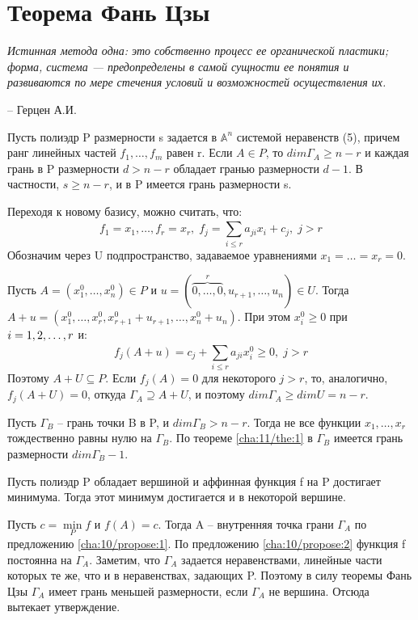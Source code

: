 \chapter{Теорема Фань Цзы}
\label{cha:12}

\epigraph{
	\textit{Истинная метода одна: это собственно процесс ее органической пластики; форма, система — предопределены в самой сущности ее понятия и развиваются по мере стечения условий и возможностей осуществления их.}}
{-- Герцен А.И.}

\begin{theorem}\label{cha:12/the:1}
	Пусть полиэдр P размерности s задается в $\mathbb{A}^n$ системой неравенств (5), причем ранг линейных частей $f_1, \dots, f_m$ равен r. Если $A \in P$, то $dim \Gamma_A \ge n−r$ и каждая грань в P размерности $d > n − r$ обладает гранью размерности $d − 1$. В частности, $s \ge n − r$, и в P имеется грань размерности s.
\end{theorem}
\begin{Proof}
	Переходя к новому базису, можно считать, что:
	$$f_1 = x_1, \dots, f_r = x_r, \; f_j= \underset{i \le r}{\overset{}{\sum}}a_{ji} x_i + c_j, \; j > r$$
	Обозначим через U подпространство, задаваемое уравнениями $x_1 = \dots = x_r =0$.

	Пусть $A = (x_1^0, \dots, x_n^0) \in P$ и $u = ( \overbrace{0, \dots, 0}^{r}, u_{r+1}, \dots, u_n) \in U$. Тогда $A + u = (x_1^0, \dots, x_r^0, x_{r+1}^0 + u_{r+1}, \dots, x_n^0 + u_n)$. При этом $x_i^0 \ge 0$ при $i = 1,2,\dots,r$ и:
	$$f_j (A+u) = c_j + \underset{i \le r}{\overset{}{\sum}}a_{ji} x_i^0 \ge 0, \; j > r$$
	Поэтому $A+U \subseteq P$. Если $f_j(A) = 0$ для некоторого $j > r$, то, аналогично, $f_j(A+U) = 0$, откуда $\Gamma_A \supseteq A+U$, и поэтому $dim \Gamma_A \ge dim U = n − r$.
	
	Пусть $\Gamma_B$ – грань точки B в P, и $dim \Gamma_B > n−r$. Тогда не все функции $x_1, \dots, x_r$ тождественно равны нулю на $\Gamma_B$. По теореме \ref{cha:11/the:1} в $\Gamma_B$ имеется грань размерности $dim \Gamma_B − 1$.
\end{Proof}

\begin{theorem}[]\label{cha:12/the:2}
	Пусть полиэдр P обладает вершиной и аффинная функция f на P достигает минимума. Тогда этот минимум достигается и в некоторой вершине.
\end{theorem}
\begin{Proof}
	Пусть $c = \underset{P}{\min} f$ и $f(A) = c$. Тогда A – внутренняя точка грани $\Gamma_A$ по предложению \ref{cha:10/propose:1}. По предложению \ref{cha:10/propose:2} функция f постоянна на $\Gamma_A$. Заметим, что $\Gamma_A$ задается неравенствами, линейные части которых те же, что и в неравенствах, задающих P. Поэтому в силу теоремы Фань Цзы $\Gamma_A$ имеет грань меньшей размерности, если $\Gamma_A$ не вершина. Отсюда вытекает утверждение.
\end{Proof}
